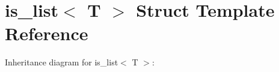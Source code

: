 \hypertarget{structis__list}{}\section{is\+\_\+list$<$ T $>$ Struct Template Reference}
\label{structis__list}


Inheritance diagram for is\+\_\+list$<$ T $>$\+:
